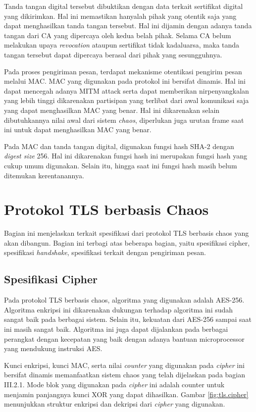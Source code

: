 Tanda tangan digital tersebut dibuktikan dengan data terkait sertifikat digital yang dikirimkan. Hal ini memastikan hanyalah pihak yang otentik saja yang dapat menghasilkan tanda tangan tersebut. Hal ini dijamin dengan adanya tanda tangan dari CA yang dipercaya oleh kedua belah pihak. Selama CA belum melakukan upaya \emph{revocation} ataupun sertifikat tidak kadaluarsa, maka tanda tangan tersebut dapat dipercaya berasal dari pihak yang sesungguhnya.

Pada proses pengiriman pesan, terdapat mekanisme otentikasi pengirim pesan melalui MAC. MAC yang digunakan pada protokol ini bersifat dinamis. Hal ini dapat mencegah adanya MITM attack serta dapat memberikan nirpenyangkalan yang lebih tinggi dikarenakan partisipan yang terlibat dari awal komunikasi saja yang dapat menghasilkan MAC yang benar. Hal ini dikarenakan selain dibutuhkannya nilai awal dari sistem \emph{chaos}, diperlukan juga urutan frame saat ini untuk dapat menghasilkan MAC yang benar.

Pada MAC dan tanda tangan digital, digunakan fungsi hash SHA-2 dengan \emph{digest size} 256. Hal ini dikarenakan fungsi hash ini merupakan fungsi hash yang cukup umum digunakan. Selain itu, hingga saat ini fungsi hash masih belum ditemukan kerentanannya.

\section{Protokol TLS berbasis Chaos}

Bagian ini menjelaskan terkait spesifikasi dari protokol TLS berbasis chaos yang akan dibangun. Bagian ini terbagi atas beberapa bagian, yaitu spesifikasi cipher, spesifikasi \emph{handshake}, spesifikasi terkait dengan pengiriman pesan.

\subsection{Spesifikasi Cipher}

Pada protokol TLS berbasis chaos, algoritma yang digunakan adalah AES-256. Algoritma enkripsi ini dikarenakan dukungan terhadap algoritma ini sudah sangat baik pada berbagai sistem. Selain itu, kekuatan dari AES-256 sampai saat ini masih sangat baik. Algoritma ini juga dapat dijalankan pada berbagai perangkat dengan kecepatan yang baik dengan adanya bantuan microprocessor yang mendukung instruksi AES.

Kunci enkripsi, kunci MAC, serta nilai \emph{counter} yang digunakan pada \emph{cipher} ini bersifat dinamis memanfaatkan sistem chaos yang telah dijelaskan pada bagian III.2.1. Mode blok yang digunakan pada \emph{cipher} ini adalah counter untuk menjamin panjangnya kunci XOR yang dapat dihasilkan. Gambar \ref{fig:tls.cipher} menunjukkan struktur enkripsi dan dekripsi dari \emph{cipher} yang digunakan.

